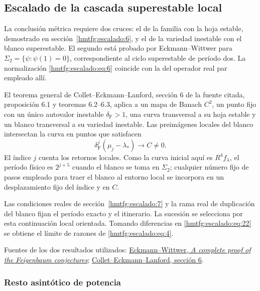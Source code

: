 \subsection{Escalado de la cascada superestable local}
\label{hmtfg:escalado:8}

La conclusión métrica requiere dos cruces: el de la familia con la hoja estable, demostrado en sección~\ref{hmtfg:escalado:6}, y el de la variedad inestable con el blanco superestable. El segundo está probado por Eckmann–Wittwer para
\(\Sigma_2=\{\psi:\psi(1)=0\}\), correspondiente al ciclo superestable de período dos. La normalización \eqref{hmtfg:escalado:eq:6} coincide con la del operador real par empleado allí.

El teorema general de Collet–Eckmann–Lanford, sección 6 de la fuente citada, proposición 6.1 y teoremas 6.2–6.3, aplica a un mapa de Banach \(C^2\), un punto fijo con un único autovalor inestable \(\delta_{\mathrm F}>1\), una curva transversal a su hoja estable y un blanco transversal a su variedad inestable. Las preimágenes locales del blanco intersectan la curva en puntos que satisfacen
\begin{equation}
\delta_{\mathrm F}^j(\mu_j-\lambda_*)\longrightarrow C\ne0.
\label{hmtfg:escalado:eq:22}
\end{equation}
El índice \(j\) cuenta los retornos locales. Como la curva inicial aquí es \(R^4f_\lambda\), el período físico es \(2^{j+5}\) cuando el blanco se toma en \(\Sigma_2\); cualquier número fijo de pasos empleado para traer el blanco al entorno local se incorpora en un desplazamiento fijo del índice y en \(C\).

Las condiciones reales de sección~\ref{hmtfg:escalado:7} y la rama real de duplicación del blanco fijan el período exacto y el itinerario. La sucesión se selecciona por esta continuación local orientada. Tomando diferencias en \eqref{hmtfg:escalado:eq:22} se obtiene el límite de razones de \eqref{hmtfg:escalado:eq:4}.

Fuentes de los dos resultados utilizados: \href{https://link.springer.com/article/10.1007/BF01013368}{Eckmann–Wittwer, \emph{A complete proof of the Feigenbaum conjectures}}; \href{https://people.math.harvard.edu/~knill/history/lanford/papers/ColletEckmannLanford.pdf}{Collet–Eckmann–Lanford, sección 6}.

\subsubsection{Resto asintótico de potencia}

